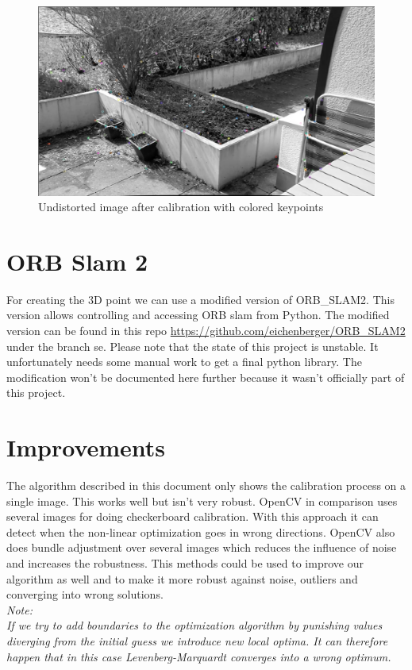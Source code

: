 \documentclass[11pt,a4paper,titlepage,oneside]{report}
\begin{document}
\begin{figure}[H]
  \begin{center}
		\includegraphics[width=1.0\textwidth]{img/calib_output.png}
  \end{center}
	\caption{Undistorted image after calibration with colored keypoints}\label{fig:undistorted}
\end{figure}

\section{ORB Slam 2}
For creating the 3D point we can use a modified version of ORB\_SLAM2. This version allows controlling and accessing ORB slam from Python. The modified version can be found in this repo \url{https://github.com/eichenberger/ORB\_SLAM2} under the branch se. Please note that the state of this project is unstable. It unfortunately needs some manual work to get a final python library. The modification won't be documented here further because it wasn't officially part of this project.

\section{Improvements}\label{sec:improvements}
The algorithm described in this document only shows the calibration process on a single image. This works well but isn't very robust. OpenCV in comparison uses several images for doing checkerboard calibration. With this approach it can detect when the non-linear optimization goes in wrong directions. OpenCV also does bundle adjustment over several images which reduces the influence of noise and increases the robustness. This methods could be used to improve our algorithm as well and to make it more robust against noise, outliers and converging into wrong solutions.\\
\em
Note:\\
If we try to add boundaries to the optimization algorithm by punishing values diverging from the initial guess we introduce new local optima. It can therefore happen that in this case Levenberg-Marquardt converges into a wrong optimum.
\normalfont
\end{document}
